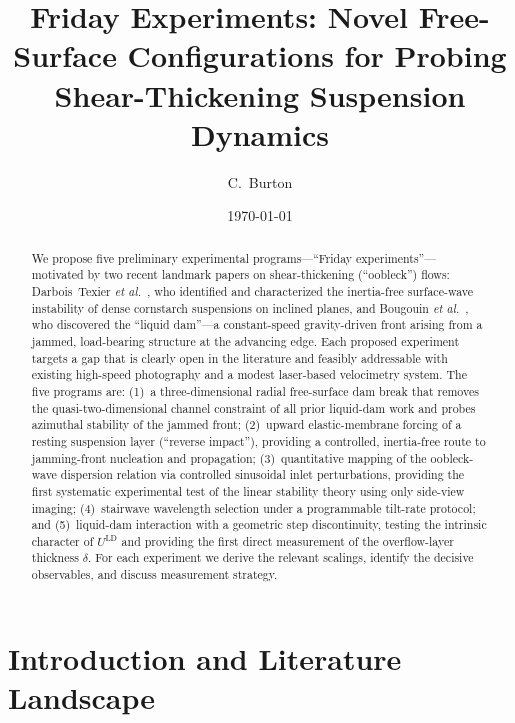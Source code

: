 \documentclass[aps,preprint,superscriptaddress,longbibliography]{revtex4-2}
\newcommand{\ULD}{{U^{\mathrm{LD}}}}
\begin{document}
\title{Friday Experiments: Novel Free-Surface Configurations for Probing
Shear-Thickening Suspension Dynamics}

\author{C.~Burton}

\date{\today}

\begin{abstract}
We propose five preliminary experimental programs---``Friday experiments''---
motivated by two recent landmark papers on shear-thickening (``oobleck'') flows:
Darbois~Texier \textit{et al.}~\cite{DarboisTexier2020,DarboisTexier2023},
who identified and characterized the inertia-free surface-wave instability
of dense cornstarch suspensions on inclined planes, and Bougouin \textit{et al.}\
\cite{Bougouin2026PRL}, who discovered the ``liquid dam''---a constant-speed
gravity-driven front arising from a jammed, load-bearing structure at the
advancing edge.  Each proposed experiment targets a gap that is clearly open in
the literature and feasibly addressable with existing high-speed photography and
a modest laser-based velocimetry system.  The five programs are:
(1)~a three-dimensional radial free-surface dam break that removes the
quasi-two-dimensional channel constraint of all prior liquid-dam work and
probes azimuthal stability of the jammed front; (2)~upward elastic-membrane
forcing of a resting suspension layer (``reverse impact''), providing a
controlled, inertia-free route to jamming-front nucleation and propagation;
(3)~quantitative mapping of the oobleck-wave dispersion relation via controlled
sinusoidal inlet perturbations, providing the first systematic experimental test
of the linear stability theory using only side-view imaging;
(4)~stairwave wavelength selection under a programmable tilt-rate protocol; and
(5)~liquid-dam interaction with a geometric step discontinuity, testing the
intrinsic character of $\ULD$ and providing the first direct measurement of the
overflow-layer thickness $\delta$.  For each experiment we derive the relevant
scalings, identify the decisive observables, and discuss measurement strategy.
\end{abstract}

\maketitle

\section{Introduction and Literature Landscape}
\label{sec:intro}
\end{document}
